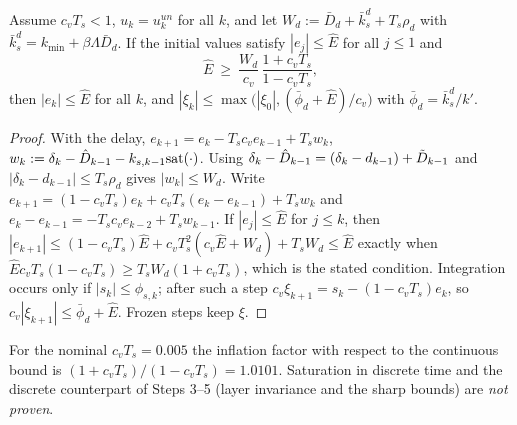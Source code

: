 \begin{lemma}\label{prop:disc-e}
Assume $c_vT_s<1$, $u_k=u^{un}_k$ for all $k$, and let $W_d:=\bar D_d+\bar k_s^d+T_s\rho_d$ with $\bar k_s^d=k_{\min}+\beta\Lambda\bar D_d$. If the initial values satisfy $|e_j|\le\hat E$ for all $j\le1$ and
\[
\hat E\ \ge\ \frac{W_d}{c_v}\,\frac{1+c_vT_s}{1-c_vT_s},
\]
then $|e_k|\le\hat E$ for all $k$, and $|\xi_k|\le\max\big(|\xi_0|,(\bar\phi_d+\hat E)/c_v\big)$ with $\bar\phi_d=\bar k_s^d/k'$.
\end{lemma}
\begin{proof}
With the delay, $e_{k+1}=e_k-T_sc_ve_{k-1}+T_sw_k$, $w_k:=\delta_k-\hat{D}_{k-1}-k_{s,k-1}\mathrm{sat}(\cdot)$. Using $\delta_k-\hat{D}_{k-1}=(\delta_k-d_{k-1})+\tilde D_{k-1}$ and $|\delta_k-d_{k-1}|\le T_s\rho_d$ gives $|w_k|\le W_d$. Write $e_{k+1}=(1-c_vT_s)e_k+c_vT_s(e_k-e_{k-1})+T_sw_k$ and $e_k-e_{k-1}=-T_sc_ve_{k-2}+T_sw_{k-1}$. If $|e_j|\le\hat E$ for $j\le k$, then $|e_{k+1}|\le(1-c_vT_s)\hat E+c_vT_s^2(c_v\hat E+W_d)+T_sW_d\le\hat E$ exactly when $\hat Ec_vT_s(1-c_vT_s)\ge T_sW_d(1+c_vT_s)$, which is the stated condition. Integration occurs only if $|s_k|\le\phi_{s,k}$; after such a step $c_v\xi_{k+1}=s_k-(1-c_vT_s)e_k$, so $c_v|\xi_{k+1}|\le\bar\phi_d+\hat E$. Frozen steps keep $\xi$.
\end{proof}
For the nominal $c_vT_s=0.005$ the inflation factor with respect to the continuous bound is $(1+c_vT_s)/(1-c_vT_s)=1.0101$. Saturation in discrete time and the discrete counterpart of Steps 3--5 (layer invariance and the sharp bounds) are \emph{not proven}.

